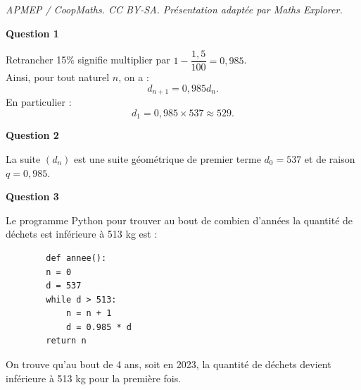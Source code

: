 \documentclass[10pt]{article}
\begin{document}
\noindent\textit{APMEP / CoopMaths. CC BY-SA. Présentation adaptée par Maths Explorer.}\par\medskip
\textbf{Question 1}
	
	Retrancher 15\% signifie multiplier par $1 - \dfrac{1,5}{100} = 0,985$.\\
	 Ainsi, pour tout naturel $n$, on a :
	\[
	d_{n+1} = 0,985 d_n.
	\]
	En particulier :
	\[
	d_1 = 0,985 \times 537 \approx 529.
	\]
	
	\textbf{Question 2}
	
	La suite $(d_n)$ est une suite géométrique de premier terme $d_0 = 537$ et de raison $q = 0,985$.
	
	\textbf{Question 3}
	
	Le programme Python pour trouver au bout de combien d'années la quantité de déchets est inférieure à 513 kg est :
	
	\begin{verbatim}
		def annee():
		n = 0
		d = 537
		while d > 513:
		    n = n + 1
		    d = 0.985 * d
		return n
	\end{verbatim}
	
	On trouve qu'au bout de 4 ans, soit en 2023, la quantité de déchets devient inférieure à 513 kg pour la première fois.
\end{document}
